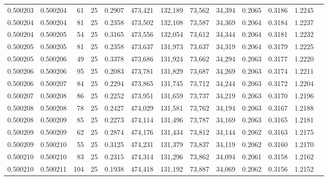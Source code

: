 \begin{tabular}{rrrrrrrrrrrrr}
0.500203 & 0.500204 &  61 &  25 &                                     0.2907 & 473,421 & 132,189 &  73,562 &  34,394 & 0.2065 & 0.3186 & 1.2245 \\
0.500204 & 0.500204 &  81 &  25 &                                     0.2358 & 473,502 & 132,108 &  73,587 &  34,369 & 0.2064 & 0.3184 & 1.2237 \\
0.500204 & 0.500205 &  54 &  25 &                                     0.3165 & 473,556 & 132,054 &  73,612 &  34,344 & 0.2064 & 0.3181 & 1.2232 \\
0.500205 & 0.500205 &  81 &  25 &                                     0.2358 & 473,637 & 131,973 &  73,637 &  34,319 & 0.2064 & 0.3179 & 1.2225 \\
0.500205 & 0.500206 &  49 &  25 &                                     0.3378 & 473,686 & 131,924 &  73,662 &  34,294 & 0.2063 & 0.3177 & 1.2220 \\
0.500206 & 0.500206 &  95 &  25 &                                     0.2083 & 473,781 & 131,829 &  73,687 &  34,269 & 0.2063 & 0.3174 & 1.2211 \\
0.500206 & 0.500207 &  84 &  25 &                                     0.2294 & 473,865 & 131,745 &  73,712 &  34,244 & 0.2063 & 0.3172 & 1.2204 \\
0.500207 & 0.500208 &  86 &  25 &                                     0.2252 & 473,951 & 131,659 &  73,737 &  34,219 & 0.2063 & 0.3170 & 1.2196 \\
0.500208 & 0.500208 &  78 &  25 &                                     0.2427 & 474,029 & 131,581 &  73,762 &  34,194 & 0.2063 & 0.3167 & 1.2188 \\
0.500208 & 0.500209 &  85 &  25 &                                     0.2273 & 474,114 & 131,496 &  73,787 &  34,169 & 0.2063 & 0.3165 & 1.2181 \\
0.500209 & 0.500209 &  62 &  25 &                                     0.2874 & 474,176 & 131,434 &  73,812 &  34,144 & 0.2062 & 0.3163 & 1.2175 \\
0.500209 & 0.500210 &  55 &  25 &                                     0.3125 & 474,231 & 131,379 &  73,837 &  34,119 & 0.2062 & 0.3160 & 1.2170 \\
0.500210 & 0.500210 &  83 &  25 &                                     0.2315 & 474,314 & 131,296 &  73,862 &  34,094 & 0.2061 & 0.3158 & 1.2162 \\
0.500210 & 0.500211 & 104 &  25 &                                     0.1938 & 474,418 & 131,192 &  73,887 &  34,069 & 0.2062 & 0.3156 & 1.2152 \\

\end{tabular}
